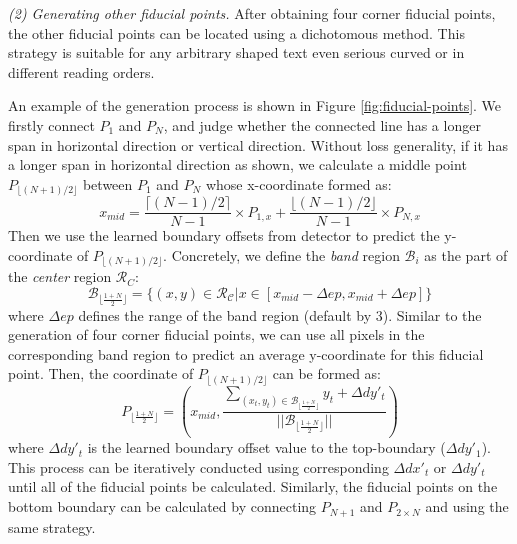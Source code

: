 \documentclass[letterpaper]{article} \usepackage{aaai20}  \usepackage{times}  \usepackage{helvet} \usepackage{courier}  \usepackage[hyphens]{url}  \usepackage{graphicx} \urlstyle{rm} \def\UrlFont{\rm}  \usepackage{graphicx}  \frenchspacing  \setlength{\pdfpagewidth}{8.5in}  \setlength{\pdfpageheight}{11in}  \usepackage{amsmath}
\begin{document}
\emph{(2) Generating other fiducial points.}
After obtaining four corner fiducial points, the other fiducial points can be located using a dichotomous method.
This strategy is suitable for any arbitrary shaped text even serious curved or in different reading orders.

An example of the generation process is shown in Figure \ref{fig:fiducial-points}.
We firstly connect $P_1$ and $P_N$, and judge whether the connected line has a longer span in horizontal direction or vertical direction. Without loss generality, if it has a longer span in horizontal direction as shown, we calculate a middle point $P_{\lfloor(N+1)/2\rfloor}$  between $P_1$ and $P_N$ whose x-coordinate formed as:
\begin{equation}
x_{mid}=\frac{\lceil(N-1)/2\rceil}{N-1}\times P_{1,x} + \frac{\lfloor(N-1)/2\rfloor}{N-1}\times P_{N,x}
\end{equation}
Then we use the learned boundary offsets from detector to predict the y-coordinate of $P_{\lfloor(N+1)/2\rfloor}$. Concretely, we define the \emph{band} region $\mathcal{B}_i$ as the part of the \emph{center} region $\mathcal{R}_C$:
\begin{equation}
\mathcal{B}_{\lfloor\frac{1+N}{2}\rfloor}=\{(x,y)\in\mathcal{R}_\mathcal{C}|x\in[x_{mid}-\Delta ep,x_{mid}+\Delta ep]\}
\end{equation}
where $\Delta ep$ defines the range of the band region (default by 3). Similar to the generation of four corner fiducial points, we can use all pixels in the corresponding band region to predict an average y-coordinate for this fiducial point. Then, the coordinate of $P_{\lfloor(N+1)/2\rfloor}$ can be formed as:
\begin{equation}
P_{\lfloor\frac{1+N}{2}\rfloor}=\left(x_{mid}, \frac{\sum_{(x_t,y_t)\in\mathcal{B}_{\lfloor\frac{1+N}{2}\rfloor}} y_t + \Delta dy'_t}{||\mathcal{B}_{\lfloor\frac{1+N}{2}\rfloor}||}\right)
\end{equation}
where $\Delta dy'_t$ is the learned boundary offset value to the top-boundary ($\Delta dy'_1$).
This process can be iteratively conducted using corresponding $\Delta dx'_t$ or $\Delta dy'_t$ until all of the fiducial points be calculated.
Similarly, the fiducial points on the bottom boundary can be calculated by connecting $P_{N+1}$ and $P_{2\times N}$ and using the same strategy.
\end{document}
